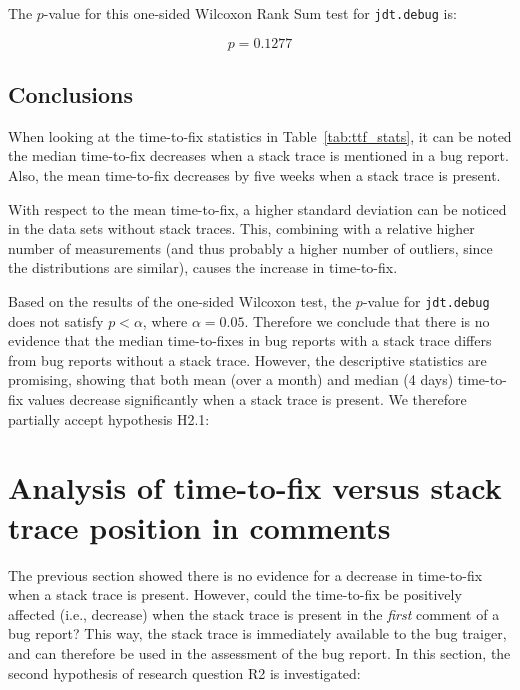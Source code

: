 The $p$-value for this one-sided Wilcoxon Rank Sum test for \texttt{jdt.debug} is:

\[
	p = 0.1277
\]


\subsection{Conclusions} %
When looking at the time-to-fix statistics in Table~\ref{tab:ttf_stats}, it can be noted the median time-to-fix decreases when a stack trace is mentioned in a bug report. Also, the mean time-to-fix decreases by five weeks when a stack trace is present. 

With respect to the mean time-to-fix, a higher standard deviation can be noticed in the data sets without stack traces. This, combining with a relative higher number of measurements (and thus probably a higher number of outliers, since the distributions are similar), causes the increase in time-to-fix.

Based on the results of the one-sided Wilcoxon test, the $p$-value for \texttt{jdt.debug} does not satisfy $p < \alpha$, where $\alpha = 0.05$. Therefore we conclude that there is no evidence that the median time-to-fixes in bug reports with a stack trace differs from bug reports without a stack trace. However, the descriptive statistics are promising, showing that both mean (over a month) and median (4 days) time-to-fix values decrease significantly when a stack trace is present. We therefore partially accept hypothesis H2.1:

\vspace{\baselineskip}
\hypba{}


\section{Analysis of time-to-fix versus stack trace position in comments} %
\label{sec:analysis_of_ttf_version_stack_trace_position_in_comments}
The previous section showed there is no evidence for a decrease in time-to-fix when a stack trace is present. However, could the time-to-fix be positively affected (i.e., decrease) when the stack trace is present in the \emph{first} comment of a bug report? This way, the stack trace is immediately available to the bug traiger, and can therefore be used in the assessment of the bug report. In this section, the second hypothesis of research question R2 is investigated:

